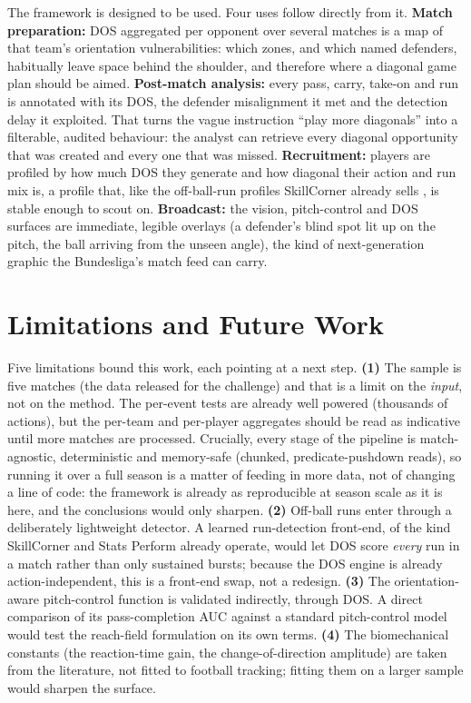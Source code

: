 \documentclass[11pt]{article}
\begin{document}
The framework is designed to be used. Four uses follow directly from
it. \textbf{Match preparation:} DOS aggregated per opponent over several
matches is a map of that team's orientation vulnerabilities: which
zones, and which named defenders, habitually leave space behind the
shoulder, and therefore where a diagonal game plan should be aimed.
\textbf{Post-match analysis:} every pass, carry, take-on and run is
annotated with its DOS, the defender misalignment it met and the detection
delay it exploited. That turns the vague instruction ``play more
diagonals'' into a filterable, audited behaviour: the analyst can
retrieve every diagonal opportunity that was created and every one that
was missed. \textbf{Recruitment:} players are profiled by how much DOS
they generate and how diagonal their action and run mix is, a profile
that, like the off-ball-run profiles SkillCorner already sells
\citep{skillcorner2024}, is stable enough to scout on. \textbf{Broadcast:}
the vision, pitch-control and DOS surfaces are immediate, legible overlays
(a defender's blind spot lit up on the pitch, the ball arriving from
the unseen angle), the kind of next-generation graphic the Bundesliga's
match feed can carry.

\section{Limitations and Future Work}
\label{sec:limitations}

Five limitations bound this work, each pointing at a next step.
\textbf{(1)} The sample is five matches (the data released for the
challenge) and that is a limit on the \emph{input}, not on the method.
The per-event tests are already well powered (thousands of actions), but
the per-team and per-player aggregates should be read as indicative until
more matches are processed. Crucially, every stage of the pipeline is
match-agnostic, deterministic and memory-safe (chunked, predicate-pushdown
reads), so running it over a full season is a matter of feeding in more
data, not of changing a line of code: the framework is already as
reproducible at season scale as it is here, and the conclusions would only
sharpen. \textbf{(2)} Off-ball runs enter through a deliberately
lightweight detector. A learned run-detection front-end, of the kind
SkillCorner \citep{skillcorner2024} and Stats Perform \citep{optavision2025}
already operate, would let DOS score \emph{every} run in a match rather
than only sustained bursts; because the DOS engine is already
action-independent, this is a front-end swap, not a redesign.
\textbf{(3)} The orientation-aware pitch-control function is validated
indirectly, through DOS. A direct comparison of its pass-completion AUC
against a standard pitch-control model \citep{spearman2017,anzer2022}
would test the reach-field formulation on its own terms. \textbf{(4)} The
biomechanical constants (the reaction-time gain, the change-of-direction
amplitude) are taken from the literature, not fitted to football
tracking; fitting them on a larger sample would sharpen the surface.
\end{document}
